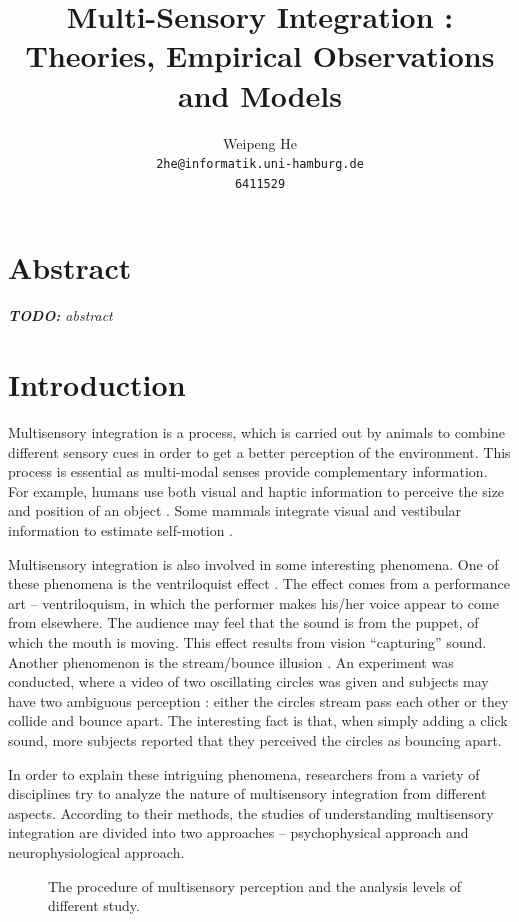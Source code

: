 \documentclass{article}[11pt]
\title{Multi-Sensory Integration : Theories, Empirical Observations and Models}
\author{Weipeng He \\ \texttt{2he@informatik.uni-hamburg.de} \\ \texttt{6411529}}
\newcommand{\inputTikZ}[1]{%
}
\newcommand{\TODO}[1]{\emph{\small{{\bf TODO: } #1}}}
\begin{document}
\maketitle

\section*{Abstract}
\TODO{abstract}


\section{Introduction}
\label{sec:intro}

Multisensory integration is a process, which is carried out by animals to combine different sensory cues in order to get a better perception of the environment. This process is essential as multi-modal senses provide complementary information.
For example, humans use both visual and haptic information to perceive the size and position of an object \cite{ernst_humans_2002}. Some mammals integrate visual and vestibular information to estimate self-motion \cite{fetsch_dynamic_2009}.

Multisensory integration is also involved in some interesting phenomena. One of these phenomena is the ventriloquist effect \cite{alais_ventriloquist_2004}. The effect comes from a performance art -- ventriloquism, in which the performer makes his/her voice appear to come from elsewhere. The audience may feel that the sound is from the puppet, of which the mouth is moving. This effect results from vision ``capturing'' sound.
Another phenomenon is the stream/bounce illusion \cite{sekuler_sound_1997}. An experiment was conducted, where a video of two oscillating circles was given and subjects may have two ambiguous perception : either the circles stream pass each other or they collide and bounce apart. The interesting fact is that, when simply adding a click sound, more subjects reported that they perceived the circles as bouncing apart.

In order to explain these intriguing phenomena, researchers from a variety of disciplines try to analyze the nature of multisensory integration from different aspects. According to their methods, the studies of understanding multisensory integration are divided into two approaches -- psychophysical approach and neurophysiological approach.

\begin{figure}[htpb]
  \centering \inputTikZ{flow}
  \caption{The procedure of multisensory perception and the analysis levels of different study.}
  \label{fig:flow}
\end{figure}
\end{document}
